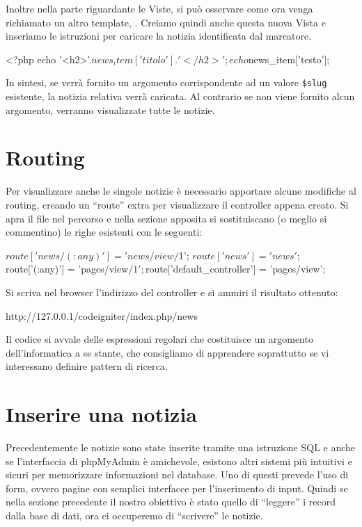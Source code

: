 Inoltre nella parte riguardante le Viste, si può osservare come ora venga richiamato un altro template, . Creiamo quindi anche questa nuova Vista  e inseriamo le istruzioni per caricare la notizia identificata dal marcatore.

\begin{code}
<?php
echo '<h2>'.$news_item['titolo'].'</h2>';
echo $news_item['testo'];
\end{code}

In sintesi, se verrà fornito un argomento corrispondente ad un valore \verb|$slug| esistente, la notizia relativa verrà caricata. Al contrario se non viene fornito alcun argomento, verranno visualizzate tutte le notizie.

\section*{Routing}
Per visualizzare anche le singole notizie è necessario apportare alcune modifiche al routing, creando un ``route'' extra per visualizzare il controller appena creato. Si apra il file  nel percorso  e nella sezione apposita si sostituiscano (o meglio si commentino) le righe esistenti con le seguenti:

\begin{code}
$route['news/(:any)'] = 'news/view/$1';
$route['news'] = 'news';
$route['(:any)'] = 'pages/view/$1';
$route['default_controller'] = 'pages/view';
\end{code}

Si scriva nel browser l'indirizzo del controller e si ammiri il risultato ottenuto:

\begin{code}
http://127.0.0.1/codeigniter/index.php/news
\end{code}

Il codice si avvale delle espressioni regolari che costituisce un argomento dell'informatica a se stante, che consigliamo di apprendere soprattutto se vi interessano definire pattern di ricerca.

\section*{Inserire una notizia}
Precedentemente le notizie sono state inserite tramite una istruzione SQL e anche se l'interfaccia di phpMyAdmin è amichevole, esistono altri sistemi più intuitivi e sicuri per memorizzare informazioni nel database. Uno di questi prevede l'uso di form, ovvero pagine con semplici interfacce per l'inserimento di input. Quindi se nella sezione precedente il nostro obiettivo è stato quello di ``leggere'' i record dalla base di dati, ora ci occuperemo di ``scrivere'' le notizie.

